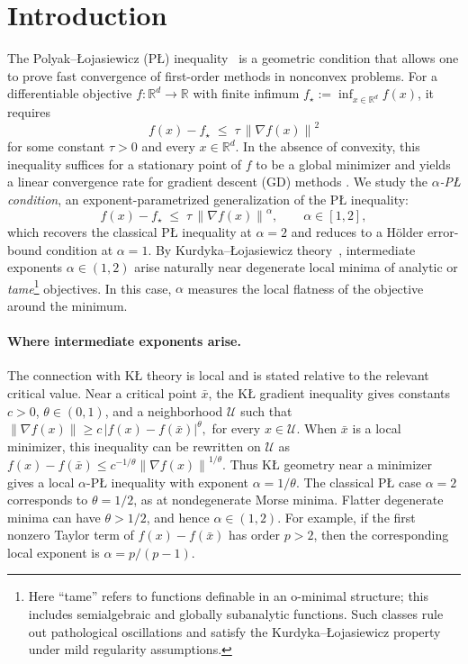 \documentclass[11pt]{article}
\newcommand{\R}{\mathbb{R}}
\newcommand{\norm}[1]{\left\lVert #1\right\rVert}
\begin{document}
\section{Introduction}

The Polyak--\L ojasiewicz (P\L{}) inequality~\citep{Polyak1963,Lojasiewicz1963} is a geometric
condition that allows one to prove fast convergence of first-order methods in nonconvex problems. For a differentiable objective
$f:\R^d\to\R$ with finite infimum $f_\star:=\inf_{x\in\R^d} f(x)$, it requires
\begin{equation*}
f(x)-f_\star\;\le\;\tau\,\norm{\nabla f(x)}^2
\end{equation*}
for some constant $\tau>0$ and every $x\in\R^d$. In the absence of convexity, this inequality suffices for a
stationary point of $f$ to be a global minimizer and yields a linear convergence rate for gradient descent (GD) methods \citep{Polyak1963,KarimiNutiniSchmidt2016}. We study the \emph{$\alpha$-P\L{}
condition}, an exponent-parametrized generalization of the P\L{} inequality:
\begin{equation}
\label{eq:alphaPL-intro}
f(x)-f_\star\;\le\;\tau\,\norm{\nabla f(x)}^\alpha,\qquad \alpha\in[1,2],
\end{equation}
which recovers the classical P\L{} inequality at $\alpha=2$ and reduces to a H\"older error-bound condition at
$\alpha=1$. By Kurdyka--\L ojasiewicz
theory~\citep{Lojasiewicz1963,Kurdyka1998,BolteDaniilidisLewis2007,AttouchBolteRedontSoubeyran2010}, intermediate
exponents $\alpha\in(1,2)$ arise naturally near degenerate local minima of analytic or \emph{tame}\footnote{Here
``tame'' refers to functions definable in an o-minimal structure; this includes semialgebraic and globally subanalytic
functions. Such classes rule out pathological oscillations and satisfy the Kurdyka--\L ojasiewicz property under mild
regularity assumptions.} objectives. In this case, $\alpha$ measures the local flatness of the objective around the
minimum.

\paragraph{Where intermediate exponents arise.}
The connection with K\L{} theory is local and is stated relative to the relevant critical value. Near a critical point
\(\bar x\), the K\L{} gradient inequality gives constants \(c>0\), \(\theta\in(0,1)\), and a neighborhood
\(\mathcal U\) such that $\norm{\nabla f(x)} \ge c\, |f(x)-f(\bar x)|^\theta,$ for every $x\in\mathcal U$.
When \(\bar x\) is a local minimizer, this inequality can be rewritten on \(\mathcal U\) as $f(x)-f(\bar x) \le c^{-1/\theta}\norm{\nabla f(x)}^{1/\theta}.$
Thus K\L{} geometry near a minimizer gives a local \(\alpha\)-P\L{} inequality with exponent \(\alpha=1/\theta\). The
classical P\L{} case \(\alpha=2\) corresponds to \(\theta=1/2\), as at nondegenerate Morse minima. Flatter degenerate
minima can have \(\theta>1/2\), and hence \(\alpha\in(1,2)\). For example, if the first nonzero Taylor term of
\(f(x)-f(\bar x)\) has order \(p>2\), then the corresponding local exponent is \(\alpha=p/(p-1)\).
\end{document}
